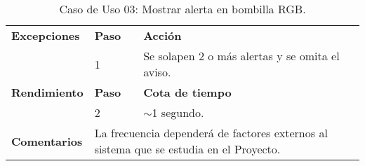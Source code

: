 \begin{table}[!ht]
{\begin{tabular}{|l|p{1cm}|p{9cm}|}
            \textbf{Excepciones} & \textbf{Paso} & \textbf{Acción} \\ \cline{2-3} & 1 & Se solapen 2 o más alertas y se omita el aviso. \\ \hline
            \textbf{Rendimiento} & \textbf{Paso} & \textbf{Cota de tiempo} \\ \cline{2-3} & 2 & $\sim$1 segundo. \\ \hline
            \textbf{Comentarios} & \multicolumn{2}{|p{10cm}|}{La frecuencia dependerá de factores externos al sistema que se estudia en el Proyecto.} \\ \hline
        \end{tabular}
        }
        \caption{Caso de Uso 03: Mostrar alerta en bombilla RGB.}
        \label{UC03}
    \end{table}

